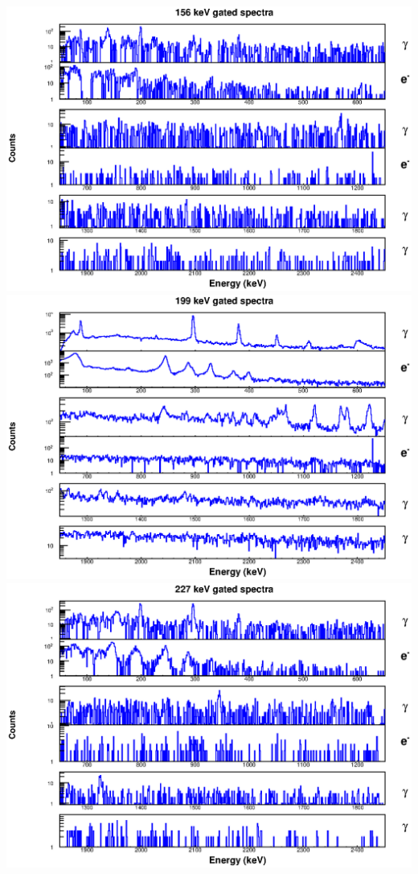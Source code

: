 \includegraphics[scale=0.8]{156Gd_Appendix/156_combined.eps}
\includegraphics[scale=0.8]{156Gd_Appendix/199_combined.eps}
\includegraphics[scale=0.8]{156Gd_Appendix/227_combined.eps}
